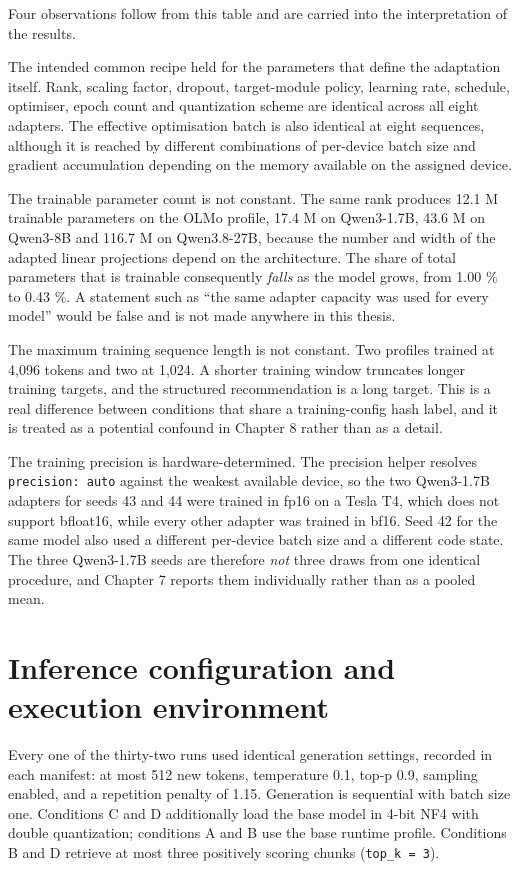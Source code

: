 Four observations follow from this table and are carried into the interpretation of the results.

The intended common recipe held for the parameters that define the adaptation itself. Rank, scaling factor, dropout, target-module policy, learning rate, schedule, optimiser, epoch count and quantization scheme are identical across all eight adapters. The effective optimisation batch is also identical at eight sequences, although it is reached by different combinations of per-device batch size and gradient accumulation depending on the memory available on the assigned device.

The trainable parameter count is not constant. The same rank produces 12.1 M trainable parameters on the OLMo profile, 17.4 M on Qwen3-1.7B, 43.6 M on Qwen3-8B and 116.7 M on Qwen3.8-27B, because the number and width of the adapted linear projections depend on the architecture. The share of total parameters that is trainable consequently \emph{falls} as the model grows, from 1.00 \% to 0.43 \%. A statement such as ``the same adapter capacity was used for every model'' would be false and is not made anywhere in this thesis.

The maximum training sequence length is not constant. Two profiles trained at 4,096 tokens and two at 1,024. A shorter training window truncates longer training targets, and the structured recommendation is a long target. This is a real difference between conditions that share a training-config hash label, and it is treated as a potential confound in Chapter 8 rather than as a detail.

The training precision is hardware-determined. The precision helper resolves \texttt{precision:\ auto} against the weakest available device, so the two Qwen3-1.7B adapters for seeds 43 and 44 were trained in fp16 on a Tesla T4, which does not support bfloat16, while every other adapter was trained in bf16. Seed 42 for the same model also used a different per-device batch size and a different code state. The three Qwen3-1.7B seeds are therefore \emph{not} three draws from one identical procedure, and Chapter 7 reports them individually rather than as a pooled mean.

\section{Inference configuration and execution environment}

Every one of the thirty-two runs used identical generation settings, recorded in each manifest: at most 512 new tokens, temperature 0.1, top-p 0.9, sampling enabled, and a repetition penalty of 1.15. Generation is sequential with batch size one. Conditions C and D additionally load the base model in 4-bit NF4 with double quantization; conditions A and B use the base runtime profile. Conditions B and D retrieve at most three positively scoring chunks (\texttt{top\_k\ =\ 3}).

